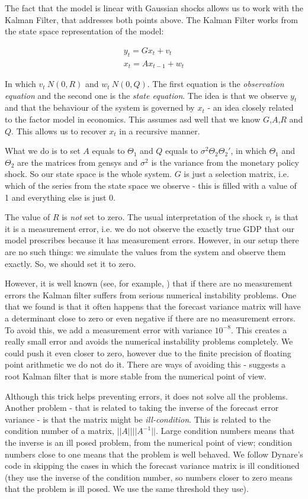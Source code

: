 \documentclass[12pt,a4paper]{article}
\begin{document}
The fact that the model is linear with Gaussian shocks allows us to work with the Kalman Filter, that addresses both points above. The Kalman Filter works from the state space representation of the model:

\begin{align} 
y_t = Gx_t + v_t\\
x_t = Ax_{t-1} + w_t
\end{align} 

In which $v_t ~ N(0,R)$ and $w_t ~ N(0,Q)$. The first equation is the \emph{observation equation} and the second one is the \emph{state equation}. The idea is that we observe $y_t$ and that the behaviour of the system is governed by $x_t$ - an idea closely related to the factor model in economics. This assumes asd well that we know $G$,$A$,$R$ and $Q$. This allows us to recover $x_t$ in a recursive manner.

What we do is to set $A$ equals to $\Theta_1$ and $Q$ equals to $\sigma^2 \Theta_2 \Theta_2'$, in which $\Theta_1$ and $\Theta_2$ are the matrices from gensys and $\sigma^2$ is the variance from the monetary policy shock. So our state space is the whole system. $G$ is just a selection matrix, i.e. which of the series from the state space we observe - this is filled with a value of 1 and everything else is just 0.

The value of $R$ is \emph{not} set to zero. The usual interpretation of the shock $v_t$ is that it is a measurement error, i.e. we do not observe the exactly true GDP that our model prescribes because it has measurement errors. However, in our setup there are no such things: we simulate the values from the system and observe them exactly. So, we should set it to zero.

However, it is well known (see, for example, \cite{Keesman2011}) that if there are no measurement errors the Kalman filter suffers from serious numerical instability problems. One that we found is that it often happens that the forecast variance matrix will have a determinant close to zero or even negative if there are no measurement errors. To avoid this, we add a measurement error with variance $10^{-8}$. This creates a really small error and avoids the numerical instability problems completely. We could push it even closer to zero, however due to the finite precision of floating point arithmetic we do not do it. There are ways of avoiding this - \cite{Keesman2011} suggests a root Kalman filter that is more stable from the numerical point of view.

Although this trick helps preventing errors, it does not solve all the problems. Another problem - that is related to taking the inverse of the forecast error variance - is that the matrix might be \emph{ill-condition}. This is related to the condition number of a matrix, $||A|| ||A^{-1}||$. Large condition numbers means that the inverse is an ill posed problem, from the numerical point of view; condition numbers close to one means that the problem is well behaved. We follow Dynare's code in skipping the cases in which the forecast variance matrix is ill conditioned (they use the inverse of the condition number, so numbers closer to zero means that the problem is ill posed. We use the same threshold they use).
\end{document}
